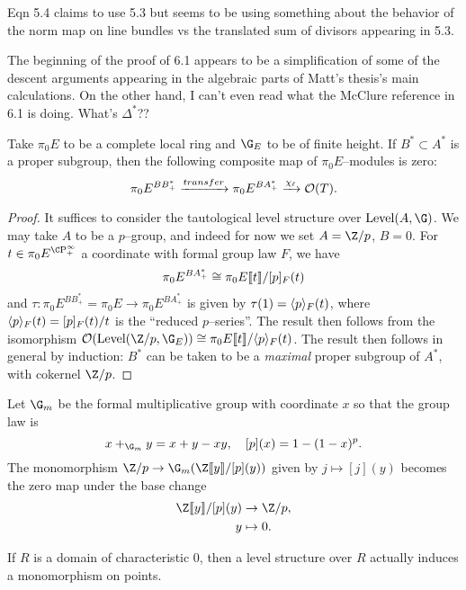 Eqn 5.4 claims to use 5.3 but seems to be using something about the behavior of the norm map on line bundles vs the translated sum of divisors appearing in 5.3.

The beginning of the proof of 6.1 appears to be a simplification of some of the descent arguments appearing in the algebraic parts of Matt's thesis's main calculations.  On the other hand, I can't even read what the McClure reference in 6.1 is doing.  What's $\Delta^*$??

\begin{lemma}
Take $\pi_0 E$ to be a complete local ring and $\G_E$ to be of finite height.  If $B^* \subset A^*$ is a proper subgroup, then the following composite map of $\pi_0 E$--modules is zero: \[\pi_0 E^{BB^*_+} \xrightarrow{transfer} \pi_0 E^{BA^*_+} \xrightarrow{\chi_\ell} \mathcal{O}(T).\]
\end{lemma}
\begin{proof}
It suffices to consider the tautological level structure over $\Level(A, \G)$.  We may take $A$ to be a $p$--group, and indeed for now we set $A = \Z/p$, $B = 0$.  For $t \in \pi_0 E^{\CP^\infty_+}$ a coordinate with formal group law $F$, we have \[\pi_0 E^{BA^*_+} \cong \pi_0 E \llbracket{t}\rrbracket / [p]_F(t)\] and $\tau: \pi_0 E^{BB^*_+} = \pi_0 E \to \pi_0 E^{BA^*_+}$ is given by $\tau(1) = \langle p\rangle_F(t)$, where $\langle p\rangle_F(t) = [p]_F(t) / t$ is the ``reduced $p$--series''.  The result then follows from the isomorphism $\sheaf O(\Level(\Z/p, \G_E)) \cong \pi_0 E\ps{t} / \<p\>_F(t)$.  The result then follows in general by induction: $B^*$ can be taken to be a \emph{maximal} proper subgroup of $A^*$, with cokernel $\Z/p$.
\end{proof}

\begin{example}
Let $\G_m$ be the formal multiplicative group with coordinate $x$ so that the group law is \[x +_{\G_m} y = x + y - xy, \quad [p](x) = 1 - (1 - x)^p.\]  The monomorphism $\Z/p \to \G_m(\Z\ps{y} / [p](y))$ given by $j \mapsto [j](y)$ becomes the zero map under the base change
\begin{align*}
\Z\ps{y} / [p](y) & \to \Z/p, \\
y & \mapsto 0.
\end{align*}
\end{example}

\begin{remark}
If $R$ is a domain of characteristic $0$, then a level structure over $R$ actually induces a monomorphism on points.
\end{remark}


